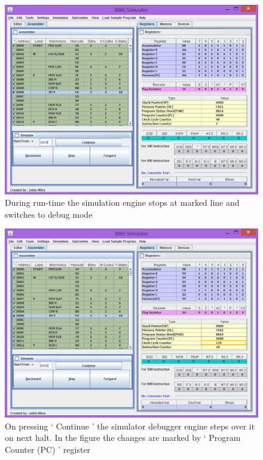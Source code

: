 \begin{figure}[htbp]
	\centering 
	\includegraphics[width=0.9\linewidth]{./Debug_3.png}
	\caption{During run-time the simulation engine stops at marked line and switches to debug mode}
	\label{fig:debug:run_time}
\end{figure}

\begin{figure}[htbp]
	\centering 
	\includegraphics[width=0.9\linewidth]{./Debug_4.png}
	\caption{On pressing ` Continue ' the simulator debugger engine steps over it on next halt. In the figure the changes are marked by ` Program Counter (PC) ' register}
	\label{fig:debug:pc}
\end{figure}

